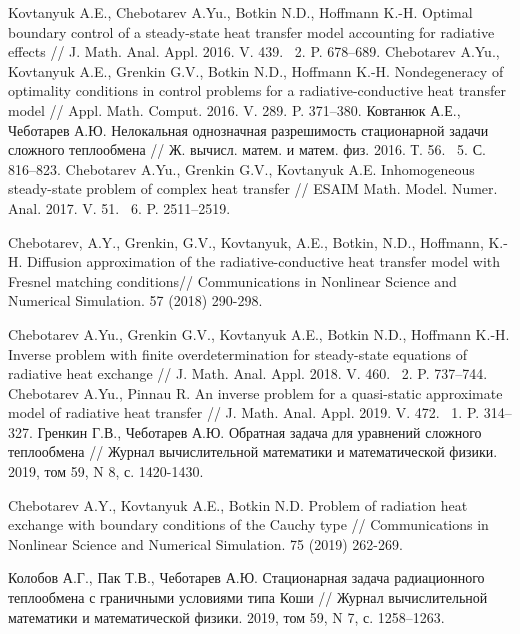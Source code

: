 \documentclass[12pt]{article}
\begin{document}
\begin{thebibliography}{999}
        Kovtanyuk A.E., Chebotarev A.Yu., Botkin N.D., Hoffmann K.-H. Optimal boundary control of a steady-state heat transfer model accounting for radiative effects // J. Math. Anal. Appl.
        2016. V. 439. \textnumero~2. P. 678--689.
        Chebotarev A.Yu., Kovtanyuk A.E., Grenkin G.V., Botkin N.D., Hoffmann K.-H\@.
        Nondegeneracy of optimality conditions in control problems for a radiative-conductive heat transfer model // Appl. Math. Comput. 2016. V. 289. P. 371--380.
        Ковтанюк А.Е., Чеботарев А.Ю. Нелокальная однозначная разрешимость стационарной задачи сложного теплообмена // Ж. вычисл. матем. и матем. физ. 2016. Т. 56. \textnumero~5. С. 816--823.
        Chebotarev A.Yu., Grenkin G.V., Kovtanyuk A.E. Inhomogeneous steady-state problem of complex heat transfer // ESAIM Math. Model. Numer. Anal. 2017. V. 51. \textnumero~6. P. 2511--2519.

        Chebotarev, A.Y., Grenkin, G.V., Kovtanyuk, A.E., Botkin, N.D., Hoffmann, K.-H. Diffusion approximation of the radiative-conductive heat transfer model with Fresnel matching conditions// Communications in Nonlinear Science and Numerical Simulation. 57 (2018) 290-298.

        Chebotarev A.Yu., Grenkin G.V., Kovtanyuk A.E., Botkin N.D., Hoffmann K.-H. Inverse problem with finite overdetermination for steady-state equations of radiative heat exchange // J. Math. Anal. Appl. 2018. V. 460. \textnumero~2. P. 737--744.
        Chebotarev A.Yu., Pinnau R. An inverse problem for a quasi-static approximate model of radiative heat transfer // J. Math. Anal. Appl. 2019. V. 472. \textnumero~1. P. 314--327.
         Гренкин Г.В., Чеботарев А.Ю. Обратная задача для уравнений сложного теплообмена // Журнал вычислительной математики и математической физики. 2019, том 59, N 8, с. 1420-1430.

        Chebotarev A.Y., Kovtanyuk A.E., Botkin N.D. Problem of radiation heat exchange with boundary conditions of the Cauchy type // Communications in Nonlinear Science and Numerical Simulation. 75 (2019) 262-269.

        Колобов А.Г., Пак Т.В., Чеботарев А.Ю.
        Стационарная задача радиационного теплообмена с граничными условиями типа Коши
        // Журнал вычислительной математики и математической физики.
        2019, том 59, N 7, с. 1258--1263.


\end{thebibliography}
\end{document}
